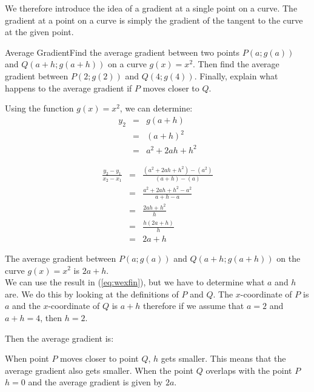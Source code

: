 We therefore introduce the idea of a gradient at a single point on a curve. The gradient at a point on a curve is simply the gradient of the tangent to the curve at the given point. 

\begin{wex}{Average Gradient}{Find the average gradient between two points $P(a;g(a))$ and $Q(a+h;g(a+h))$ on a curve $g(x)=x^2$. Then find the average gradient between $P(2;g(2))$ and $Q(4;g(4))$. Finally, explain what happens to the average gradient if $P$ moves closer to $Q$.\\}
{

Using the function $g(x)=x^2$, we can determine:
\begin{eqnarray*}
y_2&=&g(a+h)\\
&=&(a+h)^2\\
&=&a^2+2ah+h^2
\end{eqnarray*}

\begin{eqnarray}
\nonumber
\frac{y_2-y_1}{x_2-x_1}&=&\frac{(a^2+2ah+h^2)-(a^2)}{(a+h)-(a)}\\
\nonumber
&=&\frac{a^2+2ah+h^2-a^2}{a+h-a}\\
\nonumber
&=&\frac{2ah+h^2}{h}\\
\nonumber
&=&\frac{h(2a+h)}{h}\\
\label{eq:wexfin}
&=&2a+h
\end{eqnarray}

The average gradient between $P(a;g(a))$ and $Q(a+h;g(a+h))$ on the curve $g(x)=x^2$ is $2a+h$.\\

We can use the result in (\ref{eq:wexfin}), but we have to determine what $a$ and $h$ are. We do this by looking at the definitions of $P$ and $Q$. The $x$-coordinate of $P$ is $a$ and the $x$-coordinate of $Q$ is $a+h$ therefore if we assume that $a=2$ and $a+h=4$, then $h=2$.

Then the average gradient is:

When point $P$ moves closer to point $Q$, $h$ gets smaller. This means that the average gradient also gets smaller. When the point $Q$ overlaps with the point $P$ $h=0$ and the average gradient is given by $2a$.
}
\end{wex}

